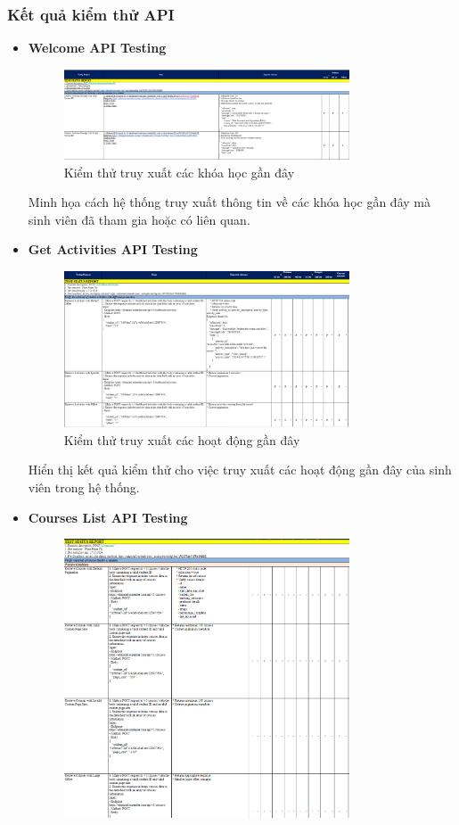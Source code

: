 \subsubsection{Kết quả kiểm thử API}
\begin{itemize}
    \item \textbf{Welcome API Testing}
    \begin{figure}[H]
        \centering
        \includegraphics[width=0.8\textwidth]{Images/test/test_WC.png}
        \caption{Kiểm thử truy xuất các khóa học gần đây}
    \end{figure}
    Minh họa cách hệ thống truy xuất thông tin về các khóa học gần đây mà sinh viên đã tham gia hoặc có liên quan.
    \item \textbf{Get Activities API Testing}
    \begin{figure}[H]
        \centering
        \includegraphics[width=0.8\textwidth]{Images/test/test_GA.png}
        \caption{Kiểm thử truy xuất các hoạt động gần đây}
    \end{figure}
    Hiển thị kết quả kiểm thử cho việc truy xuất các hoạt động gần đây của sinh viên trong hệ thống.
    \item \textbf{Courses List API Testing}
    \begin{figure}[H]
        \centering
        \includegraphics[width=0.8\textwidth]{Images/test/test_CL.png}

\end{figure}
\end{itemize}
